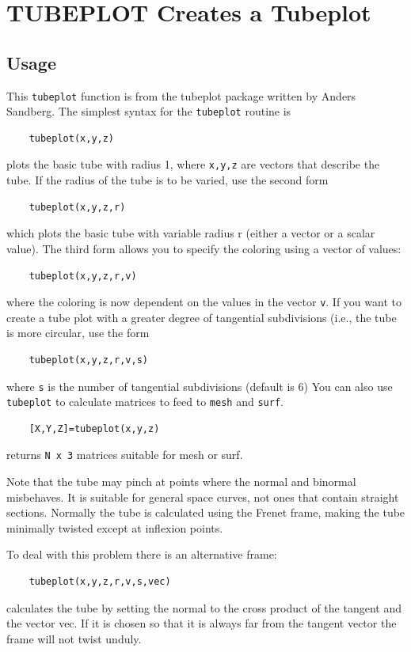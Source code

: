 \section{TUBEPLOT Creates a Tubeplot}

\subsection{Usage}

This \verb|tubeplot| function is from the tubeplot package
written by Anders Sandberg. The simplest syntax for the
\verb|tubeplot| routine is
\begin{verbatim}
    tubeplot(x,y,z)
\end{verbatim}
plots the basic tube with radius 1, where \verb|x,y,z| are
vectors that describe the tube.  If the radius of the
tube is to be varied, use the second form
\begin{verbatim}
    tubeplot(x,y,z,r) 
\end{verbatim}
which plots the basic tube with variable radius r (either 
a vector or a scalar value).  The third form allows you
to specify the coloring using a vector of values:
\begin{verbatim}
    tubeplot(x,y,z,r,v)
\end{verbatim}
where the coloring is now dependent on the values in the 
vector \verb|v|.  If you want to create a tube plot with 
a greater degree of tangential subdivisions (i.e.,
the tube is more circular, use the form
\begin{verbatim}
    tubeplot(x,y,z,r,v,s)
\end{verbatim}
where \verb|s| is the number of tangential subdivisions (default is 6)
You can also use \verb|tubeplot| to calculate matrices to feed to \verb|mesh|
and \verb|surf|.
\begin{verbatim}
    [X,Y,Z]=tubeplot(x,y,z)
\end{verbatim}
returns \verb|N x 3| matrices suitable for mesh or surf.

Note that the tube may pinch at points where the normal and binormal 
misbehaves. It is suitable for general space curves, not ones that 
contain straight sections. Normally the tube is calculated using the
Frenet frame, making the tube minimally twisted except at inflexion points.

To deal with this problem there is an alternative frame:
\begin{verbatim}
    tubeplot(x,y,z,r,v,s,vec)
\end{verbatim}
calculates the tube by setting the normal to
the cross product of the tangent and the vector vec. If it is chosen so 
that it is always far from the tangent vector the frame will not twist unduly.
